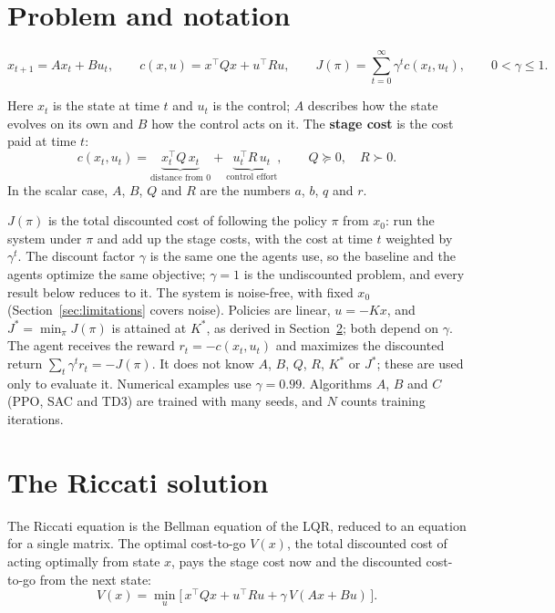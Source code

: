 \documentclass[11pt]{article}
\begin{document}
\section{Problem and notation}
\label{sec:problem}

\[
  x_{t+1} = A x_t + B u_t, \qquad c(x, u) = x^\top Q x + u^\top R u, \qquad
  J(\pi) = \sum_{t=0}^{\infty} \gamma^t c(x_t, u_t), \qquad 0 < \gamma \le 1 .
\]

Here $x_t$ is the state at time $t$ and $u_t$ is the control; $A$ describes how the state evolves on
its own and $B$ how the control acts on it. The \textbf{stage cost} is the cost paid at time $t$:
\[
  c(x_t, u_t) = \underbrace{x_t^\top Q\, x_t}_{\text{distance from } 0}
  + \underbrace{u_t^\top R\, u_t}_{\text{control effort}},
  \qquad Q \succeq 0, \quad R \succ 0 .
\]
In the scalar case, $A$, $B$, $Q$ and $R$ are the numbers $a$, $b$, $q$ and $r$.

$J(\pi)$ is the total discounted cost of following the policy $\pi$ from $x_0$: run the system under
$\pi$ and add up the stage costs, with the cost at time $t$ weighted by $\gamma^t$. The discount factor
$\gamma$ is the same one the agents use, so the baseline and the agents optimize the same objective;
$\gamma = 1$ is the undiscounted problem, and every result below reduces to it. The system is
noise-free, with fixed $x_0$ (Section~\ref{sec:limitations} covers noise). Policies are linear,
$u = -Kx$, and $J^* = \min_\pi J(\pi)$ is attained at $K^*$, as derived in Section~\ref{sec:riccati};
both depend on $\gamma$. The agent receives the reward $r_t = -c(x_t, u_t)$ and maximizes the
discounted return $\sum_t \gamma^t r_t = -J(\pi)$. It does not know $A$, $B$, $Q$, $R$, $K^*$ or
$J^*$; these are used only to evaluate it. Numerical examples use $\gamma = 0.99$. Algorithms $A$, $B$ and $C$ (PPO, SAC and TD3) are trained with many
seeds, and $N$ counts training iterations.

\section{The Riccati solution}
\label{sec:riccati}

The Riccati equation is the Bellman equation of the LQR, reduced to an equation for a single
matrix. The optimal cost-to-go $V(x)$, the total discounted cost of acting optimally from state $x$,
pays the stage cost now and the discounted cost-to-go from the next state:
\[
  V(x) = \min_u \Big[\, x^\top Q x + u^\top R u + \gamma\, V(A x + B u) \,\Big].
\]
\end{document}
